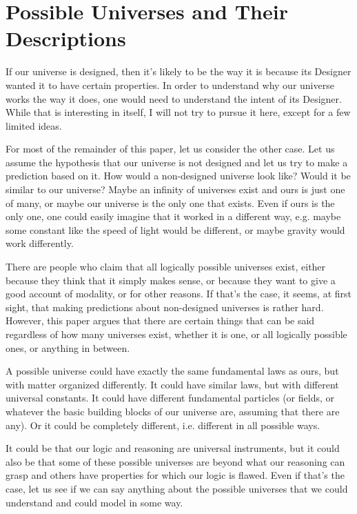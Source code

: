 \documentclass[a4paper
,draft
]{article}
\newcommand{\paper}[1]{paper}
\begin{document}
\section{Possible Universes and Their Descriptions}
\label{sec:possible-universes}

If our universe is designed, then it's likely to be the way it is because
its Designer wanted it to have certain properties.
In order to understand why our universe works the way it does,
one would need to understand the intent of its Designer.
While that is interesting in itself, I will not try to pursue it here,
except for a few limited ideas.

For most of the remainder of this \paper{}, let us consider the other case.
Let us assume the hypothesis that our universe is not designed
and let us try to make a prediction based on it.
How would a non-designed universe look like?
Would it be similar to our universe?
Maybe an infinity of universes exist and ours is just one of many,
or maybe our universe is the only one that exists.
Even if ours is the only one, one could easily imagine that it worked
in a different way, e.g. maybe some constant like the speed of light would be
different, or maybe gravity would work differently.

There are people who claim that all logically possible universes exist,
either because they think that it simply makes sense, or because they want to
give a good account of modality, or for other reasons.
If that's the case, it seems, at first sight, that making predictions about
non-designed universes is rather hard.
However, this \paper{} argues that there are certain things that can be said
regardless of how many universes exist, whether it is one, or all logically
possible ones, or anything in between.

A possible universe
could have exactly the same fundamental laws as ours, but with matter
organized differently.
It could have similar laws, but with different universal constants.
It could have different fundamental particles (or fields, or whatever the basic
building blocks of our universe are, assuming that there are any).
Or it could be completely different, i.e. different in all possible ways.

It could be that our logic and reasoning are universal instruments,
but it could also be that some of these possible universes are
beyond what our reasoning can grasp and others have properties
for which our logic is flawed.
Even if that's the case, let us see if we can say anything about
the possible universes that we could understand and could model in some way.
\end{document}
